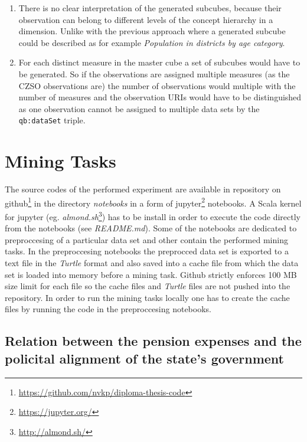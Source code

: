 \begin{enumerate}
    \item There is no clear interpretation of the generated subcubes, because their observation can belong to different levels of the concept hierarchy in a dimension. Unlike with the previous approach where a generated subcube could be described as for example \textit{Population in districts by age category}.
    \item For each distinct measure in the master cube a set of subcubes would have to be generated. So if the observations are assigned multiple measures (as the CZSO observations are) the number of observations would multiple with the number of measures and the observation URIs would have to be distinguished as one observation cannot be assigned to multiple data sets by the \verb|qb:dataSet| triple.
\end{enumerate}

\section{Mining Tasks}

The source codes of the performed experiment are available in repository on github\footnote{\href{https://github.com/nvkp/diploma-thesis-code}{https://github.com/nvkp/diploma-thesis-code}} in the directory \textit{notebooks} in a form of jupyter\footnote{\href{https://jupyter.org/}{https://jupyter.org/}} notebooks. A Scala kernel for jupyter (eg. \textit{almond.sh}\footnote{\href{http://almond.sh/}{http://almond.sh/}}) has to be install in order to execute the code directly from the notebooks (see \textit{README.md}). Some of the notebooks are dedicated to preproccesing of a particular data set and other contain the performed mining tasks. In the preproccesing notebooks the preprocced data set is exported to a text file in the \textit{Turtle} format and also saved into a cache file from which the data set is loaded into memory before a mining task.  Github strictly enforces 100 MB size limit for each file so the cache files and \textit{Turtle} files are not pushed into the repository. In order to run the mining tasks locally one has to create the cache files by running the code in the preproccesing notebooks.

\subsection{Relation between the pension expenses and the policital alignment of the state's government}

